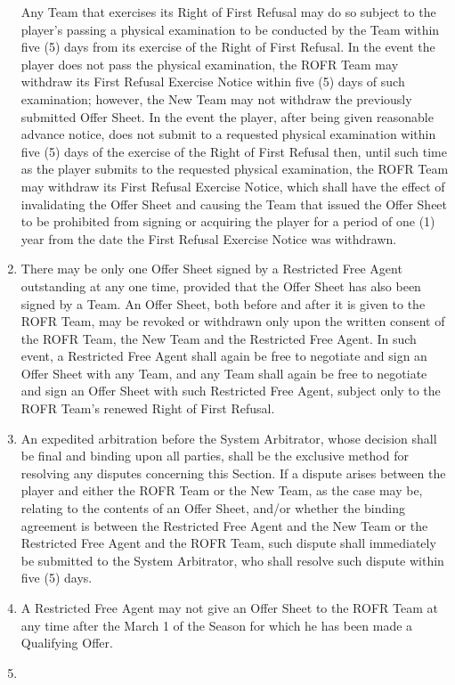 \documentclass[
]{book}
\begin{document}
\begin{enumerate}
  Any Team that exercises its Right of First Refusal may do so subject to the player's passing a physical examination to be conducted by the Team within five (5) days from its exercise of the Right of First Refusal. In the event the player does not pass the physical examination, the ROFR Team may withdraw its First Refusal Exercise Notice within five (5) days of such examination; however, the New Team may not withdraw the previously submitted Offer Sheet. In the event the player, after being given reasonable advance notice, does not submit to a requested physical examination within five (5) days of the exercise of the Right of First Refusal then, until such time as the player submits to the requested physical examination, the ROFR Team may withdraw its First Refusal Exercise Notice, which shall have the effect of invalidating the Offer Sheet and causing the Team that issued the Offer Sheet to be prohibited from signing or acquiring the player for a period of one (1) year from the date the First Refusal Exercise Notice was withdrawn.
\item
  There may be only one Offer Sheet signed by a Restricted Free Agent outstanding at any one time, provided that the Offer Sheet has also been signed by a Team. An Offer Sheet, both before and after it is given to the ROFR Team, may be revoked or withdrawn only upon the written consent of the ROFR Team, the New Team and the Restricted Free Agent. In such event, a Restricted Free Agent shall again be free to negotiate and sign an Offer Sheet with any Team, and any Team shall again be free to negotiate and sign an Offer Sheet with such Restricted Free Agent, subject only to the ROFR Team's renewed Right of First Refusal.
\item
  An expedited arbitration before the System Arbitrator, whose decision shall be final and binding upon all parties, shall be the exclusive method for resolving any disputes concerning this Section. If a dispute arises between the player and either the ROFR Team or the New Team, as the case may be, relating to the contents of an Offer Sheet, and/or whether the binding agreement is between the Restricted Free Agent and the New Team or the Restricted Free Agent and the ROFR Team, such dispute shall immediately be submitted to the System Arbitrator, who shall resolve such dispute within five (5) days.
\item
  A Restricted Free Agent may not give an Offer Sheet to the ROFR Team at any time after the March 1 of the Season for which he has been made a Qualifying Offer.
\item

\end{enumerate}
\end{document}
